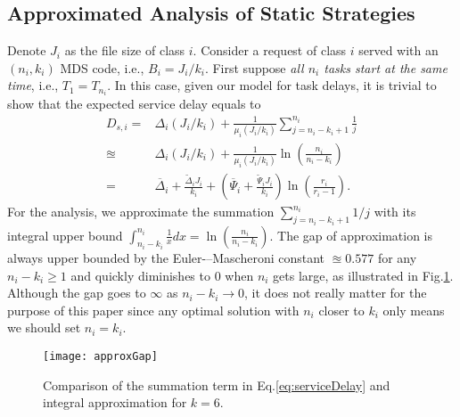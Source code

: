 \documentclass[journal]{IEEEtran}
\newcommand{\fixedDelta}{\overline{\Delta}}
\newcommand{\linearDelta}{\widetilde{\Delta}}
\newcommand{\fixedExp}{\overline{\Psi}}
\newcommand{\linearExp}{\widetilde{\Psi}}
\newcommand{\onewidth}{0.74\columnwidth}
\begin{document}
\subsection{Approximated Analysis of Static Strategies}
\label{ssec:ana:static}
Denote $J_i$ as the file size of class $i$.
Consider a request of class $i$ served with an $(n_i,k_i)$ MDS code, i.e., $B_i = J_i/k_i$. First suppose {\em all $n_i$ tasks start at the same time}, i.e., $T_1 = T_{n_i}$. In this case, given our model for task delays, it is trivial to show that the expected service delay equals to 
\begin{align}
D_{s,i} =& \Delta_i(J_i/k_i)
				+ \frac{1}{\mu_i(J_i/k_i)}
				  \sum_{j=n_i-k_i+1}^{n_i}\frac{1}{j}
\nonumber\\
\approxeq& \Delta_i(J_i/k_i) 
				+ \frac{1}{\mu_i(J_i/k_i)}\ln \left(\frac{n_i}{n_i-k_i} \right)
\nonumber\\
=& \fixedDelta_i + \frac{\linearDelta_i J_i}{k_i} + 
\left(\fixedExp_i + \frac{\linearExp_i J_i}{k_i}\right)\ln \left(\frac{r_i}{r_i-1}\right).
\label{eq:serviceDelay}
\end{align}
For the analysis, we approximate the summation $\sum_{j=n_i-k_i+1}^{n_i}1/j$ with its integral upper bound $\int_{n_i-k_i}^{n_i}\frac{1}{x} dx = \ln \left(\frac{n_i}{n_i-k_i}\right)$. The gap of approximation is always upper bounded by the Euler-–Mascheroni constant $\approxeq 0.577$ for any $n_i- k_i \ge 1$ and quickly diminishes to 0 when $n_i$ gets large, as illustrated in Fig.\ref{fig:approxGap}. Although the gap goes to $\infty$ as $n_i-k_i\rightarrow 0$, it does not really matter for the purpose of this paper since any optimal solution with $n_i$ closer to $k_i$ only means we should set $n_i=k_i$.



\begin{figure}[!t]
\centering
\texttt{[image: approxGap]}
\caption{Comparison of the summation term in Eq.\ref{eq:serviceDelay} and integral approximation for $k=6$.}
\label{fig:approxGap}
\end{figure}
\end{document}
